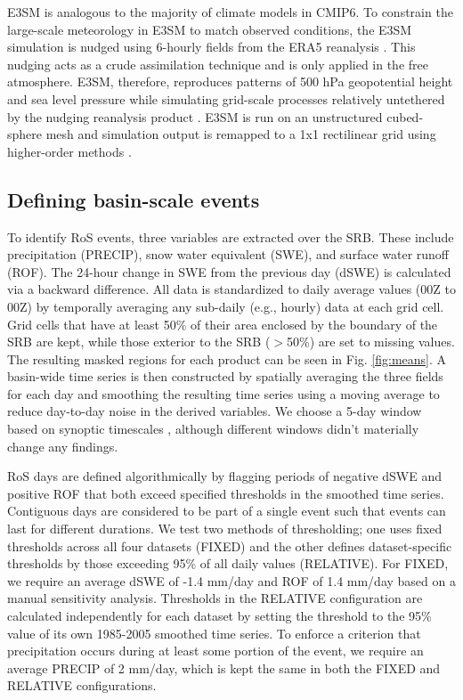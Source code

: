 \documentclass[nhess, manuscript]{copernicus}
\begin{document}
E3SM is analogous to the majority of climate models in CMIP6. 
To constrain the large-scale meteorology in E3SM to match observed conditions, the E3SM simulation is nudged using 6-hourly fields from the ERA5 reanalysis \citep{hersbach2020era5}.
This nudging acts as a crude assimilation technique and is only applied in the free atmosphere. 
E3SM, therefore, reproduces patterns of 500 hPa geopotential height and sea level pressure while simulating grid-scale processes relatively untethered by the nudging reanalysis product \citep{sun2019impact}. 
E3SM is run on an unstructured cubed-sphere mesh and simulation output is remapped to a 1\degree{}x1\degree{} rectilinear grid using higher-order methods \citep{hill2004architecture}. 

\subsection{Defining basin-scale events}

To identify RoS events, three variables are extracted over the SRB. 
These include precipitation (PRECIP), snow water equivalent (SWE), and surface water runoff (ROF). 
The 24-hour change in SWE from the previous day (dSWE) is calculated via a backward difference. 
All data is standardized to daily average values (00Z to 00Z) by temporally averaging any sub-daily (e.g., hourly) data at each grid cell.
Grid cells that have at least 50\% of their area enclosed by the boundary of the SRB are kept, while those exterior to the SRB ($>$50\%) are set to missing values. 
The resulting masked regions for each product can be seen in Fig. \ref{fig:means}. 
A basin-wide time series is then constructed by spatially averaging the three fields for each day and smoothing the resulting time series using a moving average to reduce day-to-day noise in the derived variables. 
We choose a 5-day window based on synoptic timescales \citep{holton2004introduction}, although different windows didn't materially change any findings.

RoS days are defined algorithmically by flagging periods of negative dSWE and positive ROF that both exceed specified thresholds in the smoothed time series. 
Contiguous days are considered to be part of a single event such that events can last for different durations.
We test two methods of thresholding; one uses fixed thresholds across all four datasets (FIXED) and the other defines dataset-specific thresholds by those exceeding 95\% of all daily values (RELATIVE).
For FIXED, we require an average dSWE of -1.4 mm/day and ROF of 1.4 mm/day based on a manual sensitivity analysis. 
Thresholds in the RELATIVE configuration are calculated independently for each dataset by setting the threshold to the 95\% value of its own 1985-2005 smoothed time series. 
To enforce a criterion that precipitation occurs during at least some portion of the event, we require an average PRECIP of 2 mm/day, which is kept the same in both the FIXED and RELATIVE configurations.
\end{document}
